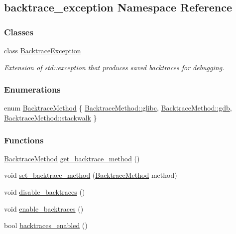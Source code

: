 \hypertarget{namespacebacktrace__exception}{\subsection{backtrace\-\_\-exception Namespace Reference}
\label{namespacebacktrace__exception}
}
\subsubsection*{Classes}
\begin{DoxyCompactItemize}
\item 
class \hyperlink{classbacktrace__exception_1_1BacktraceException}{Backtrace\-Exception}
\begin{DoxyCompactList}\small\item\em Extension of std\-::exception that produces saved backtraces for debugging. \end{DoxyCompactList}\end{DoxyCompactItemize}
\subsubsection*{Enumerations}
\begin{DoxyCompactItemize}
\item 
enum \hyperlink{namespacebacktrace__exception_ac04b358e6d3eac08b792a7c2e99b57cc}{Backtrace\-Method} \{ \hyperlink{namespacebacktrace__exception_ac04b358e6d3eac08b792a7c2e99b57cca0ded6244fb02e7fb8db8e873d25656c5}{Backtrace\-Method\-::glibc}, 
\hyperlink{namespacebacktrace__exception_ac04b358e6d3eac08b792a7c2e99b57ccaca3e1c20efd5690f9789a87c66a5047a}{Backtrace\-Method\-::gdb}, 
\hyperlink{namespacebacktrace__exception_ac04b358e6d3eac08b792a7c2e99b57ccac87739aef758816341a559291c49bbbb}{Backtrace\-Method\-::stackwalk}
 \}
\end{DoxyCompactItemize}
\subsubsection*{Functions}
\begin{DoxyCompactItemize}
\item 
\hyperlink{namespacebacktrace__exception_ac04b358e6d3eac08b792a7c2e99b57cc}{Backtrace\-Method} \hyperlink{namespacebacktrace__exception_a024cd6e7707e7f7cbb9283e60907142c}{get\-\_\-backtrace\-\_\-method} ()
\item 
void \hyperlink{namespacebacktrace__exception_afe7dd97c0deefd1a0e9cb08f9c8089b2}{set\-\_\-backtrace\-\_\-method} (\hyperlink{namespacebacktrace__exception_ac04b358e6d3eac08b792a7c2e99b57cc}{Backtrace\-Method} method)
\item 
void \hyperlink{namespacebacktrace__exception_a134895cbad5bc441a941f1f49b43a78a}{disable\-\_\-backtraces} ()
\item 
void \hyperlink{namespacebacktrace__exception_a4e1b86dea1b116c7bac88d89448a808e}{enable\-\_\-backtraces} ()
\item 
bool \hyperlink{namespacebacktrace__exception_a68f7b8565eefc4f9b862c25ec47ce2b7}{backtraces\-\_\-enabled} ()
\end{DoxyCompactItemize}


